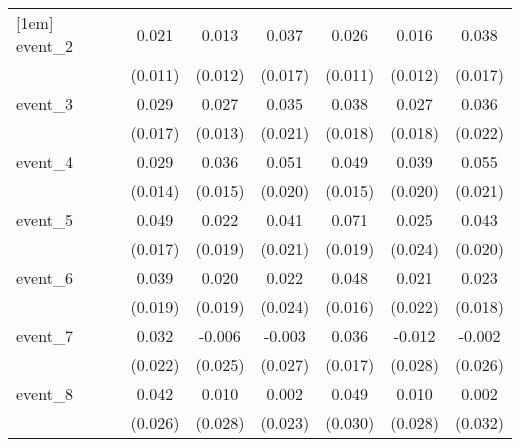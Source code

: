 {\begin{tabular}{l*{6}{c}}
[1em]
event\_2     &       0.021         &       0.013         &       0.037\sym{*}  &       0.026\sym{*}  &       0.016         &       0.038\sym{*}  \\
            &     (0.011)         &     (0.012)         &     (0.017)         &     (0.011)         &     (0.012)         &     (0.017)         \\
[1em]
event\_3     &       0.029         &       0.027\sym{*}  &       0.035         &       0.038\sym{*}  &       0.027         &       0.036         \\
            &     (0.017)         &     (0.013)         &     (0.021)         &     (0.018)         &     (0.018)         &     (0.022)         \\
[1em]
event\_4     &       0.029\sym{*}  &       0.036\sym{*}  &       0.051\sym{*}  &       0.049\sym{***}&       0.039         &       0.055\sym{**} \\
            &     (0.014)         &     (0.015)         &     (0.020)         &     (0.015)         &     (0.020)         &     (0.021)         \\
[1em]
event\_5     &       0.049\sym{**} &       0.022         &       0.041         &       0.071\sym{***}&       0.025         &       0.043\sym{*}  \\
            &     (0.017)         &     (0.019)         &     (0.021)         &     (0.019)         &     (0.024)         &     (0.020)         \\
[1em]
event\_6     &       0.039\sym{*}  &       0.020         &       0.022         &       0.048\sym{**} &       0.021         &       0.023         \\
            &     (0.019)         &     (0.019)         &     (0.024)         &     (0.016)         &     (0.022)         &     (0.018)         \\
[1em]
event\_7     &       0.032         &      -0.006         &      -0.003         &       0.036\sym{*}  &      -0.012         &      -0.002         \\
            &     (0.022)         &     (0.025)         &     (0.027)         &     (0.017)         &     (0.028)         &     (0.026)         \\
[1em]
event\_8     &       0.042         &       0.010         &       0.002         &       0.049         &       0.010         &       0.002         \\
            &     (0.026)         &     (0.028)         &     (0.023)         &     (0.030)         &     (0.028)         &     (0.032)         \\

\end{tabular}}
